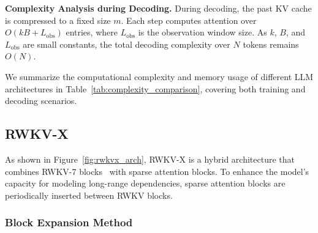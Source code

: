\textbf{Complexity Analysis during Decoding.}
During decoding, the past KV cache is compressed to a fixed size \(m\).
Each step computes attention over \(O(kB + L_{\text{obs}})\) entries, where \(L_{\text{obs}}\) is the observation window size.
As \(k\), \(B\), and \(L_{\text{obs}}\) are small constants, the total decoding complexity over \(N\) tokens remains \(O(N)\).

We summarize the computational complexity and memory usage of different LLM architectures in Table~\ref{tab:complexity_comparison}, covering both training and decoding scenarios.

\begin{table}[h]
\centering
\caption{Comparison of computational complexity and memory usage among different LLM architectures, in terms of training complexity per sequence and decoding complexity per token.}
\label{tab:complexity_comparison}
\end{table}


\subsection{RWKV-X}
As shown in Figure~\ref{fig:rwkvx_arch}, RWKV-X is a hybrid architecture that combines RWKV-7 blocks~\cite{peng2025rwkv7gooseexpressivedynamic} with sparse attention blocks.  
To enhance the model’s capacity for modeling long-range dependencies, sparse attention blocks are periodically inserted between RWKV blocks.

\subsubsection{Block Expansion Method}

